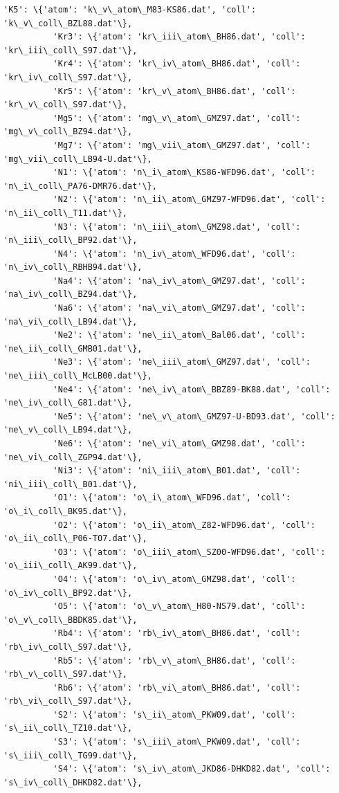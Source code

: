 \documentclass{report}
\begin{document}
\begin{Verbatim}[commandchars=\\\{\}]
          'K5': \{'atom': 'k\_v\_atom\_M83-KS86.dat', 'coll': 'k\_v\_coll\_BZL88.dat'\},
          'Kr3': \{'atom': 'kr\_iii\_atom\_BH86.dat', 'coll': 'kr\_iii\_coll\_S97.dat'\},
          'Kr4': \{'atom': 'kr\_iv\_atom\_BH86.dat', 'coll': 'kr\_iv\_coll\_S97.dat'\},
          'Kr5': \{'atom': 'kr\_v\_atom\_BH86.dat', 'coll': 'kr\_v\_coll\_S97.dat'\},
          'Mg5': \{'atom': 'mg\_v\_atom\_GMZ97.dat', 'coll': 'mg\_v\_coll\_BZ94.dat'\},
          'Mg7': \{'atom': 'mg\_vii\_atom\_GMZ97.dat', 'coll': 'mg\_vii\_coll\_LB94-U.dat'\},
          'N1': \{'atom': 'n\_i\_atom\_KS86-WFD96.dat', 'coll': 'n\_i\_coll\_PA76-DMR76.dat'\},
          'N2': \{'atom': 'n\_ii\_atom\_GMZ97-WFD96.dat', 'coll': 'n\_ii\_coll\_T11.dat'\},
          'N3': \{'atom': 'n\_iii\_atom\_GMZ98.dat', 'coll': 'n\_iii\_coll\_BP92.dat'\},
          'N4': \{'atom': 'n\_iv\_atom\_WFD96.dat', 'coll': 'n\_iv\_coll\_RBHB94.dat'\},
          'Na4': \{'atom': 'na\_iv\_atom\_GMZ97.dat', 'coll': 'na\_iv\_coll\_BZ94.dat'\},
          'Na6': \{'atom': 'na\_vi\_atom\_GMZ97.dat', 'coll': 'na\_vi\_coll\_LB94.dat'\},
          'Ne2': \{'atom': 'ne\_ii\_atom\_Bal06.dat', 'coll': 'ne\_ii\_coll\_GMB01.dat'\},
          'Ne3': \{'atom': 'ne\_iii\_atom\_GMZ97.dat', 'coll': 'ne\_iii\_coll\_McLB00.dat'\},
          'Ne4': \{'atom': 'ne\_iv\_atom\_BBZ89-BK88.dat', 'coll': 'ne\_iv\_coll\_G81.dat'\},
          'Ne5': \{'atom': 'ne\_v\_atom\_GMZ97-U-BD93.dat', 'coll': 'ne\_v\_coll\_LB94.dat'\},
          'Ne6': \{'atom': 'ne\_vi\_atom\_GMZ98.dat', 'coll': 'ne\_vi\_coll\_ZGP94.dat'\},
          'Ni3': \{'atom': 'ni\_iii\_atom\_B01.dat', 'coll': 'ni\_iii\_coll\_B01.dat'\},
          'O1': \{'atom': 'o\_i\_atom\_WFD96.dat', 'coll': 'o\_i\_coll\_BK95.dat'\},
          'O2': \{'atom': 'o\_ii\_atom\_Z82-WFD96.dat', 'coll': 'o\_ii\_coll\_P06-T07.dat'\},
          'O3': \{'atom': 'o\_iii\_atom\_SZ00-WFD96.dat', 'coll': 'o\_iii\_coll\_AK99.dat'\},
          'O4': \{'atom': 'o\_iv\_atom\_GMZ98.dat', 'coll': 'o\_iv\_coll\_BP92.dat'\},
          'O5': \{'atom': 'o\_v\_atom\_H80-NS79.dat', 'coll': 'o\_v\_coll\_BBDK85.dat'\},
          'Rb4': \{'atom': 'rb\_iv\_atom\_BH86.dat', 'coll': 'rb\_iv\_coll\_S97.dat'\},
          'Rb5': \{'atom': 'rb\_v\_atom\_BH86.dat', 'coll': 'rb\_v\_coll\_S97.dat'\},
          'Rb6': \{'atom': 'rb\_vi\_atom\_BH86.dat', 'coll': 'rb\_vi\_coll\_S97.dat'\},
          'S2': \{'atom': 's\_ii\_atom\_PKW09.dat', 'coll': 's\_ii\_coll\_TZ10.dat'\},
          'S3': \{'atom': 's\_iii\_atom\_PKW09.dat', 'coll': 's\_iii\_coll\_TG99.dat'\},
          'S4': \{'atom': 's\_iv\_atom\_JKD86-DHKD82.dat', 'coll': 's\_iv\_coll\_DHKD82.dat'\},

\end{Verbatim}
\end{document}
